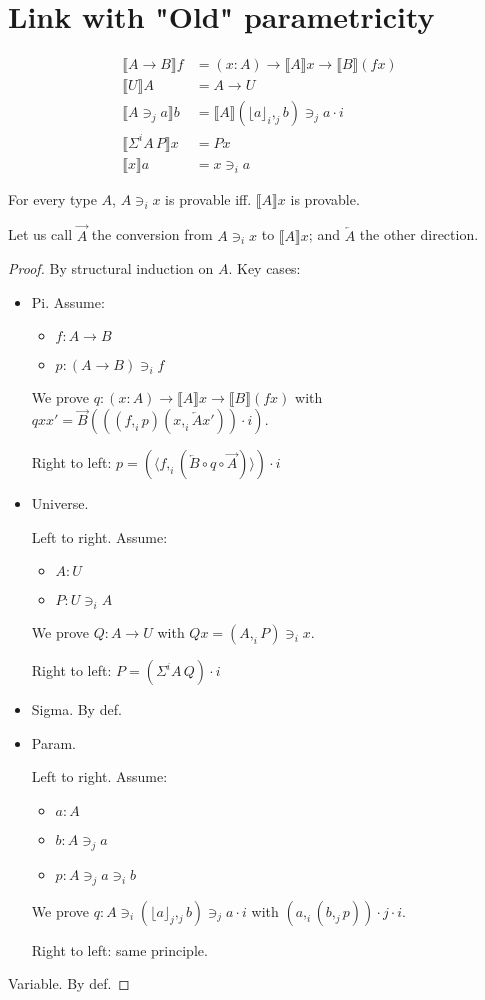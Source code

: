 \documentclass[10pt,a4paper]{article}
\newcommand\CP[3]{(#2,_{#1} #3)}
\newcommand\param[1]{\!\cdot\!#1}
\newcommand\op[1]{∋_{#1}}
\newcommand\ip[3]{Σ^{#1} {#2}\,{#3}}
\newcommand\fp[3]{⟨#2 ,_{#1} #3⟩}
\newcommand\proj[2]{⌊{#2}⌋_{#1}}
\begin{document}
\section{Link with "Old" parametricity}
\begin{definition}
  \begin{align*}
    ⟦A → B⟧ f & = (x:A) → ⟦A⟧ x → ⟦B⟧ (f x)\\
    ⟦U⟧ A & = A → U\\
    ⟦A \op j a ⟧ b &= ⟦A⟧ \CP j {\proj i a} b \op j a \param i \\
    ⟦\ip i A P⟧ x & = P x\\
    ⟦x⟧ a & = x \op i a
  \end{align*}
\end{definition}

\providecommand\TO{\overrightarrow}
\providecommand\FROM{\overleftarrow}

\begin{theorem}
For every type $A$, $A \op i x$ is provable iff. $⟦A⟧ x$ is provable.
\end{theorem}
Let us call $\TO A$ the conversion from $A \op i x$ to $⟦A⟧ x$; and $\FROM A$ the other direction.
\begin{proof}
  By structural induction on $A$. Key cases:
  \begin{itemize}
  \item Pi.
    Assume:
    \begin{itemize}
    \item $f : A → B$
    \item $p : (A → B) \op i f$
    \end{itemize}
    We prove $q : (x:A) → ⟦A⟧ x → ⟦B⟧ (f x)$ with $q x x' = \TO B ((\CP i f
    p \CP i x {\FROM A x'}) \param i)$.

    Right to left: $p = (\fp i f {(\FROM B ∘ q ∘ \TO A)}) \param i $

  \item Universe.

    Left to right. Assume:
    \begin{itemize}
    \item $A : U$
    \item $P : U \op i A $
    \end{itemize}
    We prove $Q : A → U$ with $Q x = \CP i A P \op i x$.
 

    Right to left: $P = (\ip i A Q) \param i $

  \item Sigma.
    By def.
  \item Param.

    Left to right. Assume:
    \begin{itemize}
    \item $a : A$
    \item $b : A\op j a$
    \item $p : A \op j a \op i b $
    \end{itemize}
    We prove $q : A \op i \CP j {\proj j a} b \op j a \param i  $ with $\CP i a {\CP j b p} \param j \param i$.

    Right to left: same principle.
  \end{itemize}
  \item Variable.
    By def.
\end{proof}
\end{document}
